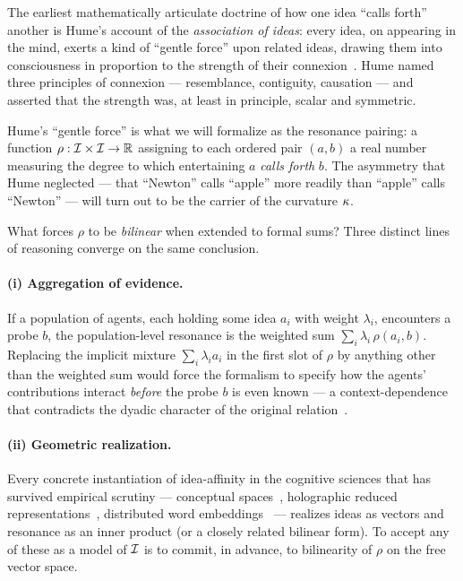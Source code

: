 The earliest mathematically articulate doctrine of how one idea ``calls
forth'' another is Hume's account of the \emph{association of ideas}: every
idea, on appearing in the mind, exerts a kind of ``gentle force'' upon
related ideas, drawing them into consciousness in proportion to the strength
of their connexion~\cite{Hume1739}. Hume named three principles of
connexion --- resemblance, contiguity, causation --- and asserted that the
strength was, at least in principle, scalar and symmetric.

\begin{interpretation}\label{int:hume-resonance}
Hume's ``gentle force'' is what we will formalize as the resonance pairing:
a function $\rho:\mathcal{I}\times\mathcal{I}\to\mathbb{R}$ assigning to each ordered pair
$(a,b)$ a real number measuring the degree to which entertaining $a$
\emph{calls forth} $b$. The asymmetry that Hume neglected --- that
``Newton'' calls ``apple'' more readily than ``apple'' calls ``Newton'' ---
will turn out to be the carrier of the curvature $\kappa$.
\end{interpretation}

What forces $\rho$ to be \emph{bilinear} when extended to formal sums? Three
distinct lines of reasoning converge on the same conclusion.

\paragraph{(i) Aggregation of evidence.}
If a population of agents, each holding some idea $a_i$ with weight
$\lambda_i$, encounters a probe $b$, the population-level resonance is the
weighted sum $\sum_i \lambda_i\,\rho(a_i,b)$. Replacing the implicit mixture
$\sum_i\lambda_i a_i$ in the first slot of $\rho$ by anything other than the
weighted sum would force the formalism to specify how the agents'
contributions interact \emph{before} the probe $b$ is even known --- a
context-dependence that contradicts the dyadic character of the original
relation~\cite{Sperber1996}.

\paragraph{(ii) Geometric realization.}
Every concrete instantiation of idea-affinity in the cognitive sciences
that has survived empirical scrutiny --- conceptual
spaces~\cite{Gardenfors2000}, holographic reduced
representations~\cite{Plate1995}, distributed word
embeddings~\cite{Mikolov2013} --- realizes ideas as vectors and resonance
as an inner product (or a closely related bilinear form). To accept any of
these as a model of $\mathcal{I}$ is to commit, in advance, to bilinearity of
$\rho$ on the free vector space.

